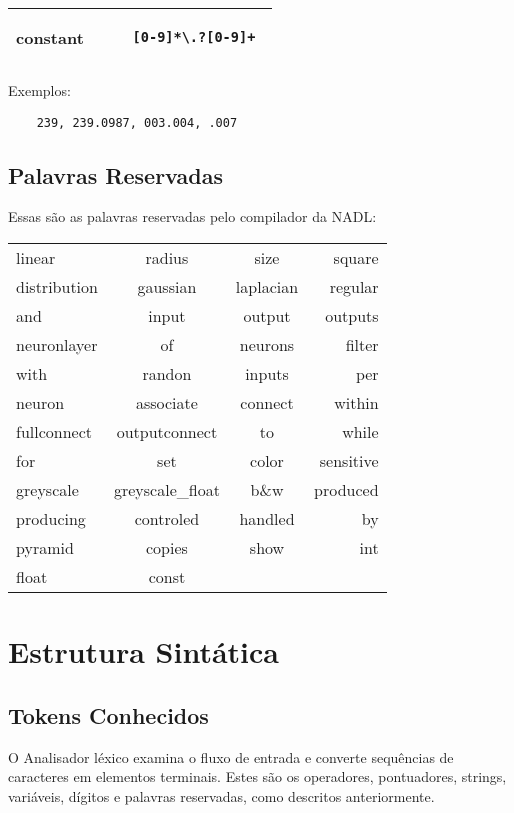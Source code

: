 \documentclass[a4paper,10pt]{article}
\begin{document}
	\begin{center}
	 \begin{tabular}{| l | r |}
	  \hline
		constant & \begin{lstlisting} 
	[0-9]*\.?[0-9]+	
	\end{lstlisting}\\
	  \hline
	 \end{tabular}
	\end{center}
	Exemplos:
	\begin{lstlisting}
	239, 239.0987, 003.004, .007
	\end{lstlisting}

	\subsection{Palavras Reservadas}
Essas s\~ao as palavras reservadas pelo compilador da NADL:
\begin{center}
 \begin{tabular}{| l | c | c | r |}
  \hline
	linear	& radius & size & square \\
	distribution & gaussian & laplacian & regular \\
	and & input & output & outputs \\
	neuronlayer & of & neurons & filter \\
	with & randon & inputs & per \\
	neuron & associate & connect & within \\
	fullconnect & outputconnect & to & while \\
	for & set & color & sensitive \\
	greyscale & greyscale\_float & b\&w & produced\\
	producing & controled & handled & by \\
	pyramid & copies & show & int \\
	float & const &  & \\
  \hline
 \end{tabular}
\end{center}

\section{Estrutura Sint\'atica}
	\subsection{Tokens Conhecidos}
O Analisador l\'exico examina o fluxo de entrada e converte sequ\^encias de caracteres em elementos terminais. Estes s\~ao os operadores, pontuadores, strings, vari\'aveis, d\'igitos e palavras reservadas, como descritos anteriormente.
\end{document}
